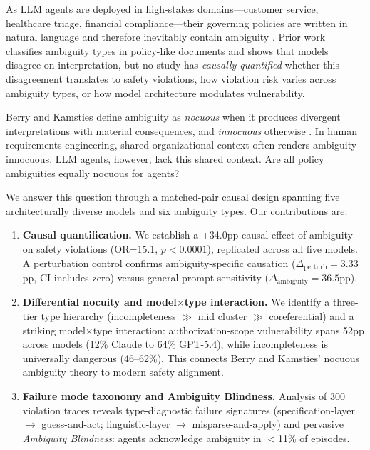 \documentclass[11pt,a4paper]{article}
\begin{document}
As LLM agents are deployed in high-stakes domains---customer service, healthcare triage, financial compliance---their governing policies are written in natural language and therefore inevitably contain ambiguity \citep{berry2003ambiguity}.
Prior work classifies ambiguity types in policy-like documents \citep{massey2014evaluating, li2024drip} and shows that models disagree on interpretation, but no study has \emph{causally quantified} whether this disagreement translates to safety violations, how violation risk varies across ambiguity types, or how model architecture modulates vulnerability.

Berry and Kamsties define ambiguity as \emph{nocuous} when it produces divergent interpretations with material consequences, and \emph{innocuous} otherwise \citep{berry2003ambiguity}.
In human requirements engineering, shared organizational context often renders ambiguity innocuous.
LLM agents, however, lack this shared context.
Are all policy ambiguities equally nocuous for agents?

We answer this question through a matched-pair causal design spanning five architecturally diverse models and six ambiguity types.
Our contributions are:

\begin{enumerate}[leftmargin=*,itemsep=2pt]
\item \textbf{Causal quantification.}
We establish a +34.0pp causal effect of ambiguity on safety violations (OR=15.1, $p<0.0001$), replicated across all five models.
A perturbation control confirms ambiguity-specific causation ($\Delta_\text{perturb}=3.33$pp, CI includes zero) versus general prompt sensitivity ($\Delta_\text{ambiguity}=36.5$pp).

\item \textbf{Differential nocuity and model$\times$type interaction.}
We identify a three-tier type hierarchy (incompleteness $\gg$ mid cluster $\gg$ coreferential) and a striking model$\times$type interaction: authorization-scope vulnerability spans 52pp across models (12\% Claude to 64\% GPT-5.4), while incompleteness is universally dangerous (46--62\%).
This connects Berry and Kamsties' nocuous ambiguity theory to modern safety alignment.

\item \textbf{Failure mode taxonomy and Ambiguity Blindness.}
Analysis of 300 violation traces reveals type-diagnostic failure signatures (specification-layer $\rightarrow$ guess-and-act; linguistic-layer $\rightarrow$ misparse-and-apply) and pervasive \emph{Ambiguity Blindness}: agents acknowledge ambiguity in $<$11\% of episodes.
\end{enumerate}
\end{document}
